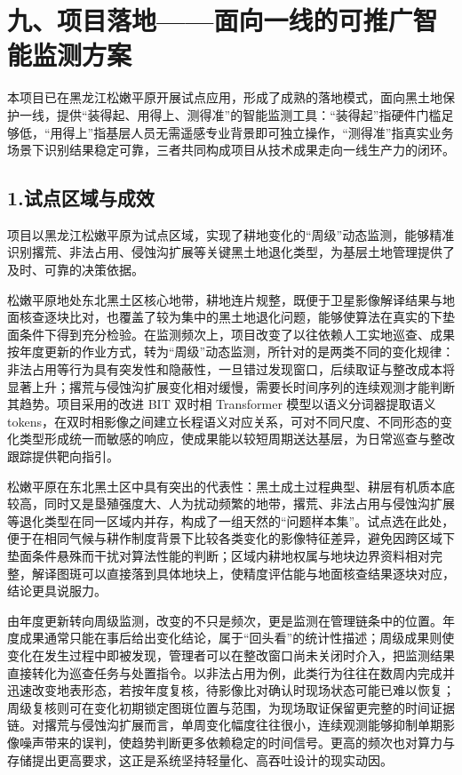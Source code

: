 \documentclass[12pt, a4paper]{ctexart}
\begin{document}
\section{九、项目落地——面向一线的可推广智能监测方案}

本项目已在黑龙江松嫩平原开展试点应用，形成了成熟的落地模式，面向黑土地保护一线，提供“装得起、用得上、测得准”的智能监测工具：“装得起”指硬件门槛足够低，“用得上”指基层人员无需遥感专业背景即可独立操作，“测得准”指真实业务场景下识别结果稳定可靠，三者共同构成项目从技术成果走向一线生产力的闭环。

\subsection{1.试点区域与成效}

项目以黑龙江松嫩平原为试点区域，实现了耕地变化的“周级”动态监测，能够精准识别撂荒、非法占用、侵蚀沟扩展等关键黑土地退化类型，为基层土地管理提供了及时、可靠的决策依据。

松嫩平原地处东北黑土区核心地带，耕地连片规整，既便于卫星影像解译结果与地面核查逐块比对，也覆盖了较为集中的黑土地退化问题，能够使算法在真实的下垫面条件下得到充分检验。在监测频次上，项目改变了以往依赖人工实地巡查、成果按年度更新的作业方式，转为“周级”动态监测，所针对的是两类不同的变化规律：非法占用等行为具有突发性和隐蔽性，一旦错过发现窗口，后续取证与整改成本将显著上升；撂荒与侵蚀沟扩展变化相对缓慢，需要长时间序列的连续观测才能判断其趋势。项目采用的改进 BIT 双时相 Transformer 模型以语义分词器提取语义 tokens，在双时相影像之间建立长程语义对应关系，可对不同尺度、不同形态的变化类型形成统一而敏感的响应，使成果能以较短周期送达基层，为日常巡查与整改跟踪提供靶向指引。

松嫩平原在东北黑土区中具有突出的代表性：黑土成土过程典型、耕层有机质本底较高，同时又是垦殖强度大、人为扰动频繁的地带，撂荒、非法占用与侵蚀沟扩展等退化类型在同一区域内并存，构成了一组天然的“问题样本集”。试点选在此处，便于在相同气候与耕作制度背景下比较各类变化的影像特征差异，避免因跨区域下垫面条件悬殊而干扰对算法性能的判断；区域内耕地权属与地块边界资料相对完整，解译图斑可以直接落到具体地块上，使精度评估能与地面核查结果逐块对应，结论更具说服力。

由年度更新转向周级监测，改变的不只是频次，更是监测在管理链条中的位置。年度成果通常只能在事后给出变化结论，属于“回头看”的统计性描述；周级成果则使变化在发生过程中即被发现，管理者可以在整改窗口尚未关闭时介入，把监测结果直接转化为巡查任务与处置指令。以非法占用为例，此类行为往往在数周内完成并迅速改变地表形态，若按年度复核，待影像比对确认时现场状态可能已难以恢复；周级复核则可在变化初期锁定图斑位置与范围，为现场取证保留更完整的时间证据链。对撂荒与侵蚀沟扩展而言，单周变化幅度往往很小，连续观测能够抑制单期影像噪声带来的误判，使趋势判断更多依赖稳定的时间信号。更高的频次也对算力与存储提出更高要求，这正是系统坚持轻量化、高吞吐设计的现实动因。
\end{document}
